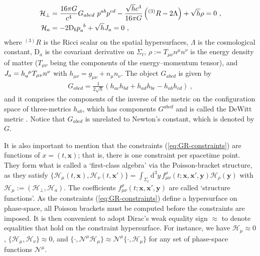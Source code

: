\documentclass[12pt]{iopart}
\def\eq#1{\begin{equation}\begin{aligned}#1\end{aligned}\end{equation}}
\def\eref#1{(\ref{eq:#1})}
\def\D{\mathrm{d}}
\def\x{\mathbf{x}}
\def\y{\mathbf{y}}
\begin{document}
\eq{\label{eq:GR-constraints}
\mathcal{H}_{\perp} &= \frac{16\pi G}{c^4} G_{abcd}\ p^{ab}p^{cd}-\frac{\sqrt{h}c^4}{16\pi G}\left(^{(3)}R-2\Lambda\right)+\sqrt{h}\rho = 0 \ , \\
\mathcal{H}_a &= -2\mathrm{D}_b\tensor{p}{_a^b}+\sqrt{h}J_a = 0 \ , 
}
where $^{(3)}R$ is the Ricci scalar on the spatial hypersurfaces, $\Lambda$ is the cosmological constant, $\mathrm{D}_a$ is the  covariant derivative on $\Sigma_t$, $\rho := T_{\mu\nu}n^{\mu}n^{\nu}$ is the energy density of matter ($T_{\mu\nu}$ being the components of the energy--momentum tensor), and $J_a = \tensor{h}{_a^{\mu}}T_{\mu\nu}n^{\nu}$ with $h_{\mu\nu} = g_{\mu\nu}+n_{\mu}n_{\nu}$. The object $G_{abcd}$ is given by
\eq{\label{eq:DeWitt-inv-metric}
G_{abcd} = \frac{1}{2\sqrt{h}}\left(h_{ac}h_{bd}+h_{ad}h_{bc}-h_{ab}h_{cd}\right) \ ,
}
and it comprises the components of the inverse of the metric on the configuration space of three-metrics $h_{ab}$, which has components $G^{abcd}$ and is called the DeWitt metric \citep{DeWitt:1967yk, Giulini:2009np}. Notice that $G_{abcd}$ is unrelated to Newton's constant, which is denoted by $G$.

It is also important to mention that the constraints \eref{GR-constraints} are functions of $x=(t,\x)$; that is, there is one constraint per spacetime point. They form what is called a `first-class algebra' via the Poisson-bracket structure, as they satisfy $\{\mathcal{H}_{\mu}(t,\x),\mathcal{H}_{\nu}(t,\x')\} = \int_{\Sigma_t}\D^3y\,f_{\mu\nu}^{\rho}(t;\x,\x',\y)\mathcal{H}_{\rho}(\y)$ with $\mathcal{H}_{\mu}:=(\mathcal{H}_{\perp},\mathcal{H}_a)$. The coefficients $f_{\mu\nu}^{\rho}(t;\x,\x',\y)$ are called `structure functions'. As the constraints \eref{GR-constraints} define a hypersurface on phase-space, all Poisson brackets must be computed before the constraints are imposed. It is then convenient to adopt Dirac's weak equality sign $\approx$ to denote equalities that hold on the constraint hypersurface. For instance, we have $\mathcal{H}_{\mu}\approx 0$, $\{\mathcal{H}_{\mu}, \mathcal{H}_{\nu}\}\approx 0$, and $\{\cdot,\mathcal{N}^{\mu}\mathcal{H}_{\mu}\}\approx \mathcal{N}^{\mu}\{\cdot,\mathcal{H}_{\mu}\}$ for any set of phase-space functions $\mathcal{N}^{\mu}$.
\end{document}
